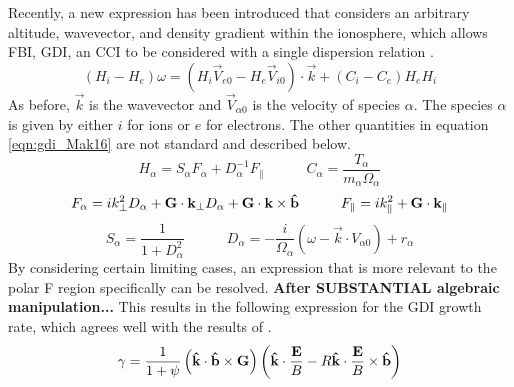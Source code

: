 Recently, a new expression has been introduced that considers an arbitrary altitude, wavevector, and density gradient within the ionosphere, which allows FBI, GDI, an CCI to be considered with a single dispersion relation \citep{Makarevich2016a}.
\begin{equation}
	\label{eqn:gdi_Mak16}
	(H_i-H_e)\omega = (H_i\vec{V}_{e0}-H_e\vec{V}_{i0})\cdot\vec{k}+(C_i-C_e)H_eH_i
\end{equation}
As before, \(\vec{k}\) is the wavevector and \(\vec{V}_{\alpha 0}\) is the velocity of species \(\alpha\).  The species \(\alpha\) is given by either \(i\) for ions or \(e\) for electrons.  The other quantities in equation \ref{eqn:gdi_Mak16} are not standard and described below.
\begin{equation}
	H_\alpha = S_\alpha F_\alpha + D_\alpha^{-1} F_\parallel \quad\quad\quad
	C_\alpha = \frac{T_\alpha}{m_\alpha \Omega_\alpha}
\end{equation}
\begin{equation}
	F_\alpha = i k_\perp^2 D_\alpha + \mathbf{G}\cdot\mathbf{k}_\perp D_\alpha + \mathbf{G}\cdot\mathbf{k}\times\mathbf{\hat{b}} \quad\quad\quad
	F_\parallel = i k_\parallel^2 + \mathbf{G}\cdot\mathbf{k}_\parallel
\end{equation}
\begin{equation}
	S_\alpha = \frac{1}{1+D_\alpha^2} \quad\quad\quad
	D_\alpha = -\frac{i}{\Omega_\alpha}(\omega-\vec{k}\cdot{V}_{\alpha 0})+r_\alpha
\end{equation}
By considering certain limiting cases, an expression that is more relevant to the polar F region specifically can be resolved.  \textbf{After SUBSTANTIAL algebraic manipulation...}  This results in the following expression for the GDI growth rate, which agrees well with the results of \citet{Makarevitch2014c}.
\begin{equation}
	\label{eqn:gdi}
	\gamma = \frac{1}{1+\psi}\left(\mathbf{\hat{k}}\cdot\mathbf{\hat{b}}\times\mathbf{G}\right)\left(\mathbf{\hat{k}}\cdot\frac{\mathbf{E}}{B}-R\mathbf{\hat{k}}\cdot\frac{\mathbf{E}}{B}\times\mathbf{\hat{b}}\right)
\end{equation}

